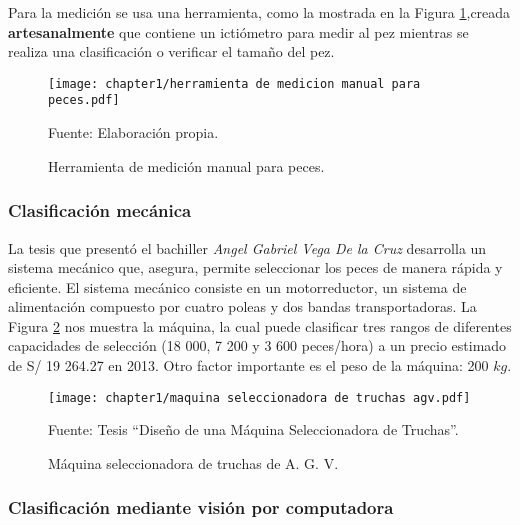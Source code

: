 Para la medición se usa una herramienta, como la mostrada en la Figura \ref{fig:herramienta de medicion manual para peces},creada \textbf{artesanalmente} que contiene un ictiómetro para medir al pez mientras se realiza una clasificación o verificar el tamaño del pez. 

\begin{figure}[H]
	\centering
	\texttt{[image: chapter1/herramienta de medicion manual para peces.pdf]}
	\caption{Herramienta de medición manual para peces.}
	\begin{myflushleftportland}
		Fuente: Elaboración propia.
	\end{myflushleftportland}			
	\label{fig:herramienta de medicion manual para peces}
\end{figure}

\subsubsection{Clasificación mecánica}

La tesis que presentó el bachiller \textit{Angel Gabriel Vega De la Cruz} desarrolla un sistema mecánico que, asegura, permite seleccionar los peces de manera rápida y eficiente. El sistema mecánico consiste en un motorreductor, un sistema de alimentación compuesto por cuatro poleas y dos bandas transportadoras. La Figura \ref{fig:maquina seleccionadora de truchas agv} nos muestra la máquina, la cual puede clasificar tres rangos de  diferentes capacidades de selección (18 000, 7 200 y 3 600 peces/hora) a un precio estimado de S/ 19 264.27 en 2013. Otro factor importante es el peso de la máquina: 200 $ kg $.\citep[p.~2,105]{Vega2013}

\begin{figure}[H]
	\centering
	\texttt{[image: chapter1/maquina seleccionadora de truchas agv.pdf]}
	\caption{Máquina seleccionadora de truchas de A. G. V.}
	\begin{myflushleftportland}
		Fuente: Tesis “Diseño de una Máquina Seleccionadora de Truchas”.
	\end{myflushleftportland}	
	\label{fig:maquina seleccionadora de truchas agv}
\end{figure}

\subsubsection{Clasificación mediante visión por computadora}

